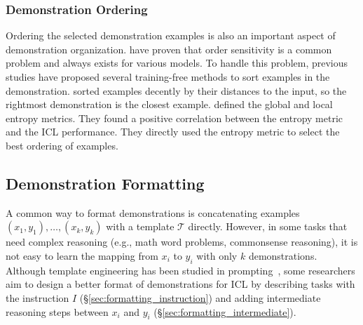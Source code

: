 \subsubsection{Demonstration Ordering}
\label{sec:order}
Ordering the selected demonstration examples is also an important aspect of demonstration organization. 
\citet{lu2022order} have proven that order sensitivity is a common problem and always exists for various models. 
To handle this problem, previous studies have proposed several training-free methods to sort examples in the demonstration. \citet{liu2022close} sorted examples decently by their distances to the input, so the rightmost demonstration is the closest example.
\citet{lu2022order}  defined the global and local entropy metrics. They found a positive correlation between the entropy metric and the ICL performance. They directly used the entropy metric to select the best ordering of examples. %




\subsection{Demonstration Formatting}
\label{sec:format}
A common way to format demonstrations is concatenating examples $(x_1, y_1), \ldots, (x_k, y_k)$ with a template $\mathcal{T}$ directly. However, in some tasks that need complex reasoning (e.g., math word problems, commonsense reasoning), it is not easy to learn the mapping from $x_i$ to $y_i$ with only $k$ demonstrations. Although template engineering has been studied in prompting~\citep{liu2021pre},  some researchers aim to design a better format of demonstrations for ICL by describing tasks with the instruction $I$ (\S\ref{sec:formatting_instruction}) and adding intermediate reasoning steps between $x_i$ and $y_i$ (\S\ref{sec:formatting_intermediate}).



